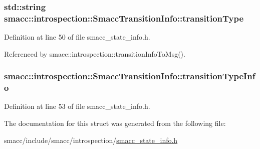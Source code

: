 \subsubsection[{\texorpdfstring{transition\+Type}{transitionType}}]{\setlength{\rightskip}{0pt plus 5cm}std\+::string smacc\+::introspection\+::\+Smacc\+Transition\+Info\+::transition\+Type}\hypertarget{structsmacc_1_1introspection_1_1SmaccTransitionInfo_a8f4682c18a3b6c09f6b942a4fa7b524d}{}\label{structsmacc_1_1introspection_1_1SmaccTransitionInfo_a8f4682c18a3b6c09f6b942a4fa7b524d}


Definition at line 50 of file smacc\+\_\+state\+\_\+info.\+h.



Referenced by smacc\+::introspection\+::transition\+Info\+To\+Msg().

\subsubsection[{\texorpdfstring{transition\+Type\+Info}{transitionTypeInfo}}]{ smacc\+::introspection\+::\+Smacc\+Transition\+Info\+::transition\+Type\+Info}\hypertarget{structsmacc_1_1introspection_1_1SmaccTransitionInfo_abe702ee8041ad32f2290b99c17ab9d95}{}\label{structsmacc_1_1introspection_1_1SmaccTransitionInfo_abe702ee8041ad32f2290b99c17ab9d95}


Definition at line 53 of file smacc\+\_\+state\+\_\+info.\+h.



The documentation for this struct was generated from the following file\+:\begin{DoxyCompactItemize}
\item 
smacc/include/smacc/introspection/\hyperlink{smacc__state__info_8h}{smacc\+\_\+state\+\_\+info.\+h}\end{DoxyCompactItemize}
